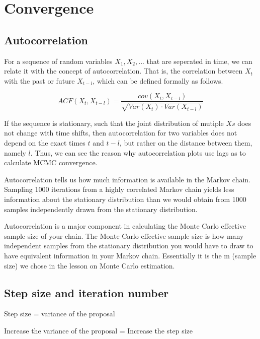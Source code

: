 \documentclass[
]{book}
\begin{document}
\hypertarget{convergence}{%
\section{Convergence}\label{convergence}}

\hypertarget{autocorrelation}{%
\subsection{Autocorrelation}\label{autocorrelation}}

For a sequence of random variables \(X_1,X_2,...\) that are seperated in time, we can relate it with the concept of autocorrelation. That is, the correlation between \(X_t\) with the past or future \(X_{t-l}\), which can be defined formally as follows.

\[ACF(X_t,X_{t-l})=\frac{cov(X_t,X_{t-l})}{\sqrt{Var(X_t) \cdot Var(X_{t-l})}}\]

If the sequence is stationary, such that the joint distribution of mutiple \(Xs\) does not change with time shifts, then autocorrelation for two variables does not depend on the exact times \(t\) and \(t-l\), but rather on the distance between them, namely \(l\). Thus, we can see the reason why autocorrelation plots use lags as to calculate MCMC convergence.

Autocorrelation tells us how much information is available in the Markov chain. Sampling 1000 iterations from a highly correlated Markov chain yields less information about the stationary distribution than we would obtain from 1000 samples independently drawn from the stationary distribution.

Autocorrelation is a major component in calculating the Monte Carlo effective sample size of your chain. The Monte Carlo effective sample size is how many independent samples from the stationary distribution you would have to draw to have equivalent information in your Markov chain. Essentially it is the m (sample size) we chose in the lesson on Monte Carlo estimation.

\hypertarget{step-size-and-iteration-number}{%
\subsection{Step size and iteration number}\label{step-size-and-iteration-number}}

Step size = variance of the proposal

Increase the variance of the proposal = Increase the step size
\end{document}

